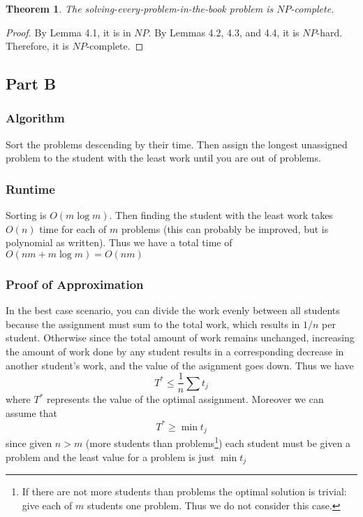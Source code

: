\documentclass{article}
\newtheorem{theorem}{Theorem}[section]
\begin{document}
\begin{theorem}
The solving-every-problem-in-the-book problem is $NP$-complete.
\end{theorem}
\begin{proof}
By Lemma 4.1, it is in $NP$. By Lemmas 4.2, 4.3, and 4.4, it is $NP$-hard. Therefore, it is $NP$-complete.
\end{proof}

\subsection{Part B}
\subsubsection{Algorithm}

Sort the problems descending by their time. Then assign the longest unassigned problem to the student with the least work until you are out of problems.

\subsubsection{Runtime}
Sorting is $O(m\log{m})$. Then finding the student with the least work takes $O(n)$ time for each of $m$ problems (this can probably be improved, but is polynomial as written). Thus we have a total time of $O(nm+ m \log{m}) = O(nm)$ 

\subsubsection{Proof of Approximation}

In the best case scenario, you can divide the work evenly between all students because the assignment must sum to the total work, which results in $1/n$ per student. Otherwise since the total amount of work remains unchanged, increasing the amount of work done by any student results in a corresponding decrease in another student's work, and the value of the asignment goes down. Thus we have 
\[T^* \leq \frac{1}{n} \sum{t_j}\]
where $T^*$ represents the value of the optimal assignment. Moreover we can assume that 
\[T^* \geq \min{t_j}\]
since given $n > m$ (more students than problems\footnote{If there are not more students than problems the optimal solution is trivial: give each of $m$ students one problem. Thus we do not consider this case.}) each student must be given a problem and the least value for a problem is just $\min{t_j}$
\end{document}
